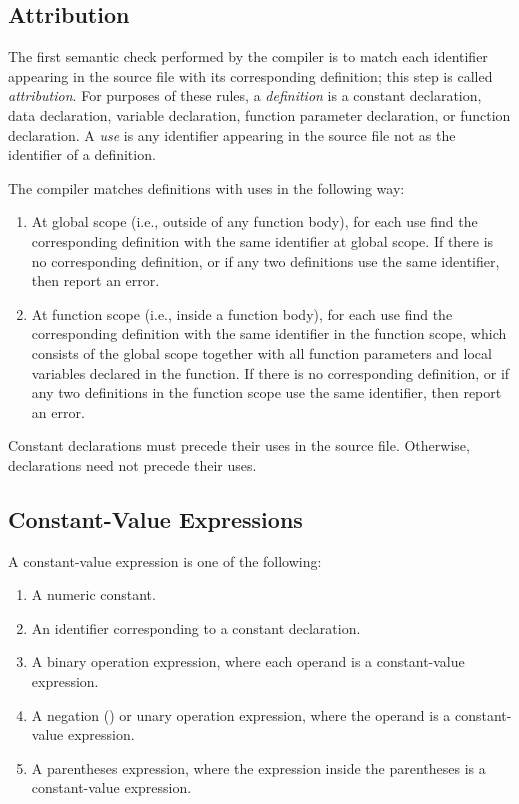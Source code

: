 \documentclass[10pt]{article}
\begin{document}
\subsection{Attribution}
\label{sec:semantics:attr}

The first semantic check performed by the compiler is to match each
identifier appearing in the source file with its corresponding
definition; this step is called \emph{attribution}.  For purposes of
these rules, a \emph{definition} is a constant declaration, data
declaration, variable declaration, function parameter declaration, or
function declaration.  A \emph{use} is any identifier appearing in the
source file not as the identifier of a definition.

The compiler matches definitions with uses in the following way:
%
\begin{enumerate}
%
\item At global scope (i.e., outside of any function body), for each
  use find the corresponding definition with the same identifier at
  global scope.  If there is no corresponding definition, or if any
  two definitions use the same identifier, then  report an error.
%
\item At function scope (i.e., inside a function body), for each use
  find the corresponding definition with the same identifier in the
  function scope, which consists of the global scope together with all
  function parameters and local variables declared in the function.
  If there is no corresponding definition, or if any two definitions
  in the function scope use the same identifier, then report an error.
%
\end{enumerate}
% 
Constant declarations must precede their uses in the source file.
Otherwise, declarations need not precede their uses.

\subsection{Constant-Value Expressions}
\label{sec:semantics:constant-value-expr}

A constant-value expression is one of the following:
%
\begin{enumerate}
%
\item A numeric constant.
%
\item An identifier corresponding to a constant declaration.
%
\item A binary operation expression, where each operand is a
  constant-value expression.
%
\item A negation (\kwd{-}) or  unary operation expression,
  where the operand is a constant-value expression.
%
\item A parentheses expression, where the expression inside the
  parentheses is a constant-value expression.
%
\end{enumerate}
\end{document}

